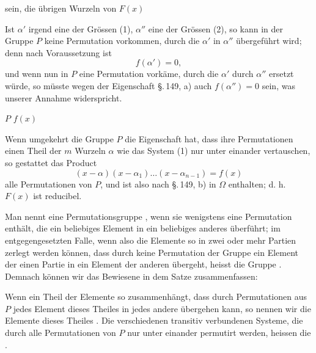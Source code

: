sein, die übrigen Wurzeln von $F(x)$

Ist $\alpha'$ irgend eine der Grössen (1), $\alpha''$ eine der Grössen (2),
so kann in der Gruppe $P$ keine Permutation vorkommen, durch die $\alpha'$ in
$\alpha''$ übergeführt wird; denn nach Voraussetzung ist
\[
f(\alpha') = 0,
\]
und wenn nun in $P$ eine Permutation vorkäme, durch die $\alpha'$ durch
$\alpha''$ ersetzt würde, so müsste wegen der Eigenschaft \S.\,149, a) auch
$f(\alpha'') = 0$ sein, was unserer Annahme widerspricht.

 $P$  $f(x)$ 

Wenn umgekehrt die Gruppe $P$ die Eigenschaft hat, dass ihre Permutationen
einen Theil der $m$ Wurzeln $\alpha$ wie das System (1) nur unter einander
vertauschen, so gestattet das Product
\[
(x - \alpha)(x - \alpha_1) \ldots (x - \alpha_{n-1}) = f(x)
\]
alle Permutationen von $P$, und ist also nach \S.\,149, b) in $\Omega$
enthalten; d. h. $F(x)$ ist reducibel.

Man nennt eine Permutationsgruppe , wenn sie wenigstens
eine Permutation enthält, die ein beliebiges Element in ein beliebiges
anderes überführt; im entgegengesetzten Falle, wenn also die Elemente so in
zwei oder mehr Partien zerlegt werden können, dass durch keine Permutation
der Gruppe ein Element der einen Partie in ein Element der anderen übergeht,
heisst die Gruppe
. Demnach können wir das Bewiesene in dem Satze
zusammenfassen:


Wenn ein Theil der Elemente so zusammenhängt, dass durch Permutationen aus
$P$ jedes Element dieses Theiles in jedes andere übergehen kann, so nennen
wir die Elemente dieses Theiles . Die
verschiedenen transitiv verbundenen Systeme, die durch alle Permutationen von
$P$ nur unter einander permutirt werden, heissen die .
